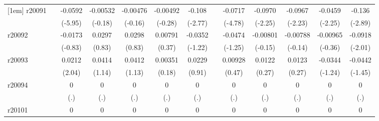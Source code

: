 {\begin{tabular}{l*{12}{c}}
[1em]
r20091      &                     &     -0.0592\sym{***}&    -0.00532         &    -0.00476         &    -0.00492         &      -0.108\sym{**} &                     &     -0.0717\sym{***}&     -0.0970\sym{*}  &     -0.0967\sym{*}  &     -0.0459\sym{*}  &      -0.136\sym{**} \\
            &                     &     (-5.95)         &     (-0.18)         &     (-0.16)         &     (-0.28)         &     (-2.77)         &                     &     (-4.78)         &     (-2.25)         &     (-2.23)         &     (-2.25)         &     (-2.89)         \\
[1em]
r20092      &                     &     -0.0173         &      0.0297         &      0.0298         &     0.00791         &     -0.0352         &                     &     -0.0474         &    -0.00801         &    -0.00788         &    -0.00965         &     -0.0918\sym{*}  \\
            &                     &     (-0.83)         &      (0.83)         &      (0.83)         &      (0.37)         &     (-1.22)         &                     &     (-1.25)         &     (-0.15)         &     (-0.14)         &     (-0.36)         &     (-2.01)         \\
[1em]
r20093      &                     &      0.0212\sym{*}  &      0.0414         &      0.0412         &     0.00351         &      0.0229         &                     &     0.00928         &      0.0122         &      0.0123         &     -0.0344         &     -0.0442         \\
            &                     &      (2.04)         &      (1.14)         &      (1.13)         &      (0.18)         &      (0.91)         &                     &      (0.47)         &      (0.27)         &      (0.27)         &     (-1.24)         &     (-1.45)         \\
[1em]
r20094      &                     &           0         &           0         &           0         &           0         &           0         &                     &           0         &           0         &           0         &           0         &           0         \\
            &                     &         (.)         &         (.)         &         (.)         &         (.)         &         (.)         &                     &         (.)         &         (.)         &         (.)         &         (.)         &         (.)         \\
[1em]
r20101      &                     &           0         &           0         &           0         &           0         &           0         &                     &           0         &           0         &           0         &           0         &           0         \\

\end{tabular}}
